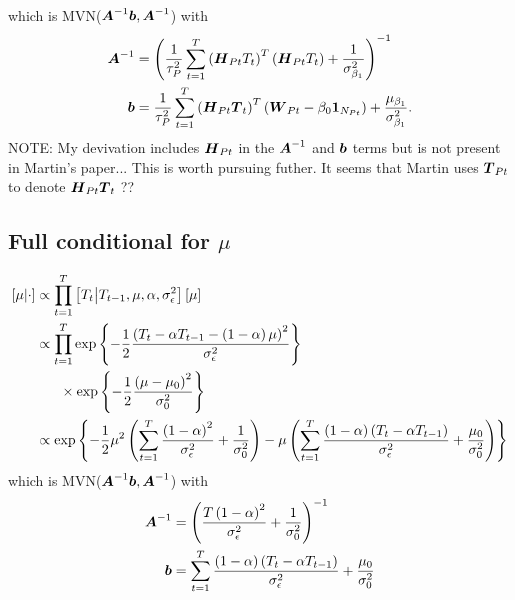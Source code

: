 \documentclass{article}\usepackage[]{graphicx}\usepackage[]{color}
\def\bm#1{\mbox{\boldmath $#1$}}
\begin{document}
which is MVN($\bm{A}^{ - 1}\bm{b}, \bm{A}^{ - 1}$) with
%
\begin{align*}
%
\bm{A}^{ - 1} & = \left( \frac{1} {\tau^2_P} \sum_{t = 1}^T \left( \bm{H}_{Pt} T_t \right)^T \left( \bm{H}_{Pt} T_t \right) + \frac{1} {\sigma^2_{\beta_1}} \right)^{ - 1}\\
%
\bm{b} & = \frac{1} {\tau^2_P} \sum_{t = 1}^T \left( \bm{H}_{Pt} \bm{T}_t \right)^T \left( \bm{W}_{Pt} - \beta_0 \bm{1}_{N_{Pt}} \right) + \frac{\mu_{\beta_1}} {\sigma^2_{\beta_1}}.\\
%
\end{align*}
%
NOTE: My devivation includes $\bm{H}_{Pt}$ in the $\bm{A}^{ - 1}$ and $\bm{b}$ terms but is not present in Martin's paper... This is worth pursuing futher. It seems that Martin uses $\bm{T}_{Pt}$ to denote $\bm{H}_{Pt} \bm{T}_t$ ??
%
%
\subsection{Full conditional for $\mu$}
%
\begin{align*}
%
\left[ \mu \middle| \cdot \right] & \propto \prod_{t = 1}^T \left[ T_t \middle| T_{t - 1}, \mu, \alpha, \sigma^2_\epsilon \right] \left[ \mu \right] \\
%
& \propto \prod_{t = 1}^T \exp{ \left\{ - \frac{1} {2} \frac{\left( T_t  - \alpha T_{t - 1} - \left( 1 - \alpha \right) \mu \right)^2} {\sigma^2_\epsilon} \right\} }\\
& \hspace{6mm} \times \exp{ \left\{ - \frac{1} {2} \frac{\left( \mu - \mu_0 \right)^2} {\sigma^2_0} \right\} }\\
%
& \propto \exp{ \left\{ - \frac{1} {2} \mu^2 \left( \sum_{t = 1}^T \frac{\left( 1 - \alpha \right)^2} {\sigma^2_\epsilon} + \frac{1} {\sigma^2_0} \right) - \mu \left( \sum_{t = 1}^T \frac{\left( 1 - \alpha \right) \left( T_t - \alpha T_{t - 1} \right)} {\sigma^2_\epsilon} + \frac{\mu_0} {\sigma^2_0} \right) \right\} }\\
%
%
\end{align*}
%
which is MVN($\bm{A}^{ - 1}\bm{b}, \bm{A}^{ - 1}$) with 
%
\begin{align*}
\bm{A}^{ - 1} & = \left( \frac{ T \left( 1 - \alpha \right)^2} {\sigma^2_\epsilon}  + \frac{1} {\sigma^2_0} \right)^{ - 1}\\
%
\bm{b} & = \sum_{t = 1}^T \frac{\left( 1 - \alpha \right) \left( T_t - \alpha T_{t - 1} \right)} {\sigma^2_\epsilon} + \frac{\mu_0} {\sigma^2_0}\\
%
\end{align*}
%
%
%
\end{document}
